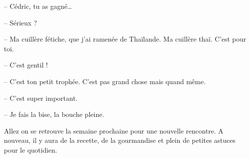 \documentclass[11pt, french]{report}
\begin{document}
-- Cédric, tu as gagné…

-- Sérieux ?

-- Ma cuillère fétiche, que j’ai ramenée de Thaïlande. Ma cuillère thaï. C’est
pour toi.

-- C’est gentil !

-- C’est ton petit trophée. C’est pas grand chose mais quand même.

-- C’est super important.

-- Je fais la bise, la bouche pleine.

Allez on se retrouve la semaine prochaine pour une nouvelle rencontre. A nouveau,
il y aura de la recette, de la gourmandise et plein de petites astuces pour le
quotidien.

\vfill
\end{document}
